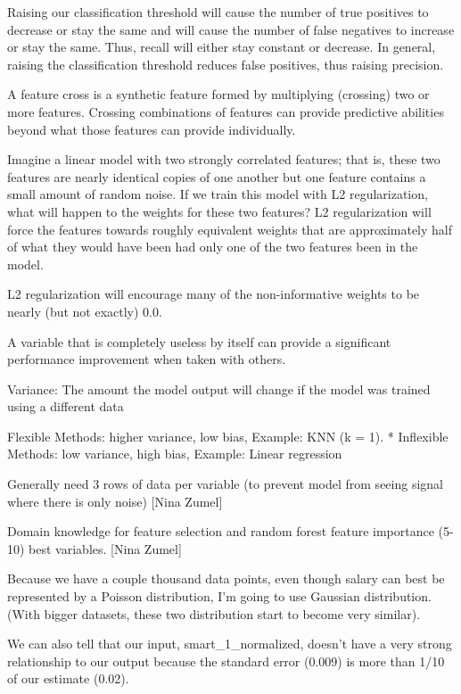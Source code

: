 \documentclass[]{book}
\begin{document}
Raising our classification threshold will cause the number of true positives to decrease or stay the same and will cause the number of false negatives to increase or stay the same. Thus, recall will either stay constant or decrease. In general, raising the classification threshold reduces false positives, thus raising precision.

A feature cross is a synthetic feature formed by multiplying (crossing) two or more features. Crossing combinations of features can provide predictive abilities beyond what those features can provide individually.

Imagine a linear model with two strongly correlated features; that is, these two features are nearly identical copies of one another but one feature contains a small amount of random noise. If we train this model with L2 regularization, what will happen to the weights for these two features? L2 regularization will force the features towards roughly equivalent weights that are approximately half of what they would have been had only one of the two features been in the model.

L2 regularization will encourage many of the non-informative weights to be nearly (but not exactly) 0.0.

A variable that is completely useless by itself can provide a significant performance improvement when taken with others.

Variance: The amount the model output will change if the model was trained using a different data

Flexible Methods: higher variance, low bias, Example: KNN (k = 1). * Inflexible Methods: low variance, high bias, Example: Linear regression

Generally need 3 rows of data per variable (to prevent model from seeing signal where there is only noise) {[}Nina Zumel{]}

Domain knowledge for feature selection and random forest feature importance (5-10) best variables. {[}Nina Zumel{]}

Because we have a couple thousand data points, even though salary can best be represented by a Poisson distribution, I'm going to use Gaussian distribution. (With bigger datasets, these two distribution start to become very similar).

We can also tell that our input, smart\_1\_normalized, doesn't have a very strong relationship to our output because the standard error (0.009) is more than 1/10 of our estimate (0.02).
\end{document}
